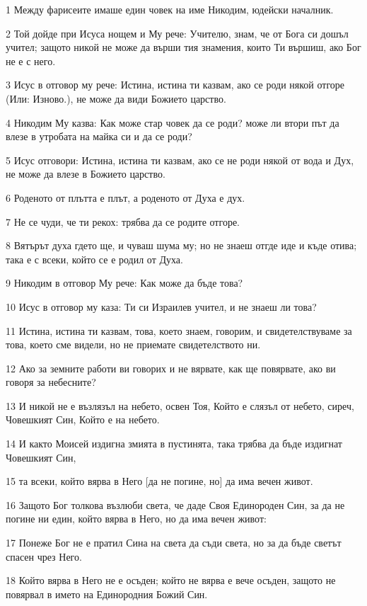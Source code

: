 \par 1 Между фарисеите имаше един човек на име Никодим, юдейски началник.
\par 2 Той дойде при Исуса нощем и Му рече: Учителю, знам, че от Бога си дошъл учител; защото никой не може да върши тия знамения, които Ти вършиш, ако Бог не е с него.
\par 3 Исус в отговор му рече: Истина, истина ти казвам, ако се роди някой отгоре (Или: Изново.), не може да види Божието царство.
\par 4 Никодим Му казва: Как може стар човек да се роди? може ли втори път да влезе в утробата на майка си и да се роди?
\par 5 Исус отговори: Истина, истина ти казвам, ако се не роди някой от вода и Дух, не може да влезе в Божието царство.
\par 6 Роденото от плътта е плът, а роденото от Духа е дух.
\par 7 Не се чуди, че ти рекох: трябва да се родите отгоре.
\par 8 Вятърът духа гдето ще, и чуваш шума му; но не знаеш отгде иде и къде отива; така е с всеки, който се е родил от Духа.
\par 9 Никодим в отговор Му рече: Как може да бъде това?
\par 10 Исус в отговор му каза: Ти си Израилев учител, и не знаеш ли това?
\par 11 Истина, истина ти казвам, това, което знаем, говорим, и свидетелствуваме за това, което сме видели, но не приемате свидетелството ни.
\par 12 Ако за земните работи ви говорих и не вярвате, как ще повярвате, ако ви говоря за небесните?
\par 13 И никой не е възлязъл на небето, освен Тоя, Който е слязъл от небето, сиреч, Човешкият Син, Който е на небето.
\par 14 И както Моисей издигна змията в пустинята, така трябва да бъде издигнат Човешкият Син,
\par 15 та всеки, който вярва в Него [да не погине, но] да има вечен живот.
\par 16 Защото Бог толкова възлюби света, че даде Своя Единороден Син, за да не погине ни един, който вярва в Него, но да има вечен живот:
\par 17 Понеже Бог не е пратил Сина на света да съди света, но за да бъде светът спасен чрез Него.
\par 18 Който вярва в Него не е осъден; който не вярва е вече осъден, защото не повярвал в името на Единородния Божий Син.
